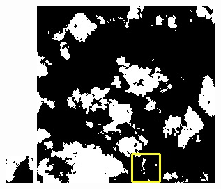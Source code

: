 \documentclass[UTF8]{ctexart}
\begin{document}
\begin{figure}[H]
{\begin{minipage}[b]{0.15\linewidth}
            \includegraphics[width=1\linewidth]{../log/spoon2/cut/tmp_cut_LC80350192014190LGN00_06561_my.jpg}\vspace{4pt}
            \includegraphics[width=1\linewidth]{../log/spoon2/cut/LC80980712014024LGN00_15443_my.jpg}\vspace{4pt}

\end{minipage}}
\end{figure}
\end{document}
